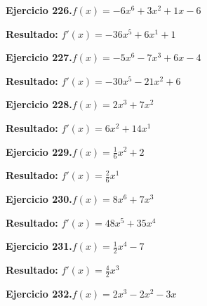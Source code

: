 \documentclass[10pt,a4paper]{article}
\begin{document}
\newpage
\begin{ejbox}
\textbf{Ejercicio 226.}\quad $f(x) = -6x^{6} +3x^{2} +1x -6$
\end{ejbox}

\begin{solbox}
\textbf{Resultado:} \(\displaystyle f'(x) = -36x^{5} +6x^{1} +1\)
\end{solbox}

\begin{ejbox}
\textbf{Ejercicio 227.}\quad $f(x) = -5x^{6} -7x^{3} +6x -4$
\end{ejbox}

\begin{solbox}
\textbf{Resultado:} \(\displaystyle f'(x) = -30x^{5} -21x^{2} +6\)
\end{solbox}

\begin{ejbox}
\textbf{Ejercicio 228.}\quad $f(x) = 2x^{3} + 7x^{2}$
\end{ejbox}

\begin{solbox}
\textbf{Resultado:} \(\displaystyle f'(x) = 6x^{2} + 14x^{1}\)
\end{solbox}

\newpage
\begin{ejbox}
\textbf{Ejercicio 229.}\quad $f(x) = \frac{1}{6}x^{2} +2$
\end{ejbox}

\begin{solbox}
\textbf{Resultado:} \(\displaystyle f'(x) = \frac{2}{6}x^{1}\)
\end{solbox}

\begin{ejbox}
\textbf{Ejercicio 230.}\quad $f(x) = 8x^{6} + 7x^{3}$
\end{ejbox}

\begin{solbox}
\textbf{Resultado:} \(\displaystyle f'(x) = 48x^{5} + 35x^{4}\)
\end{solbox}

\begin{ejbox}
\textbf{Ejercicio 231.}\quad $f(x) = \frac{1}{2}x^{4} -7$
\end{ejbox}

\begin{solbox}
\textbf{Resultado:} \(\displaystyle f'(x) = \frac{4}{2}x^{3}\)
\end{solbox}

\newpage
\begin{ejbox}
\textbf{Ejercicio 232.}\quad $f(x) = 2x^{3} -2x^2 -3x$
\end{ejbox}
\end{document}
